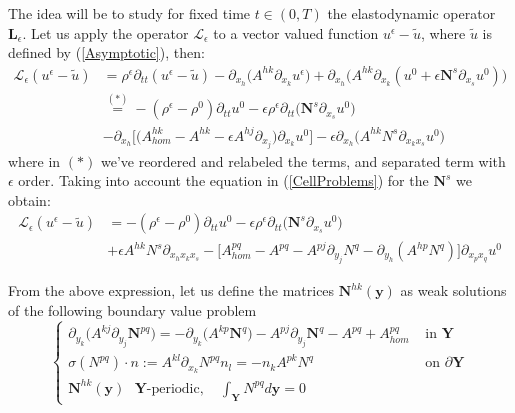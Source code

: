 The idea will be to study for fixed time $t \in (0,T)$ the elastodynamic operator $\mathbf{L}_{\epsilon}$.
Let us apply the operator $\mathcal{L}_{\epsilon}$ to a vector valued function $u^{\epsilon}-\tilde{u}$, where $\tilde{u}$ is defined by (\ref{Asymptotic}), then:
\begin{align*}
    \mathcal{L}_{\epsilon} (u^{\epsilon}-\tilde{u}) &= \rho^{\epsilon} \partial_{tt} (u^{\epsilon}-\tilde{u}) - \partial_{x_h} \big( A^{hk}\partial_{x_k} u^{\epsilon} \big) + \partial_{x_h} \big( A^{hk}\partial_{x_k} (u^0 + \epsilon \mathbf{N}^s \partial_{x_s}u^0 )\big) \\
    & \overset{(*)}{=} - (\rho^{\epsilon}-\rho^0) \partial_{tt} u^0 - \epsilon \rho^{\epsilon} \partial_{tt}\big(\mathbf{N}^s \partial_{x_s}u^0 \big)  \\
    & - \partial_{x_h} \big[ \big( A_{hom}^{hk} - A^{hk} - \epsilon A^{hj}\partial_{x_j}\big) \partial_{x_k} u^0 \big] - \epsilon \partial_{x_h} \big( A^{hk} N^s \partial_{x_k x_s} u^0 \big) 
\end{align*}
where in $(*)$ we've reordered and relabeled the terms, and separated term with $\epsilon$ order.
Taking into account the equation in (\ref{CellProblems}) for the $\mathbf{N}^s$ we obtain:
\begin{align*}
    \mathcal{L}_{\epsilon} (u^{\epsilon} - \tilde{u}) & = - (\rho^{\epsilon}-\rho^0) \partial_{tt} u^0 - \epsilon \rho^{\epsilon} \partial_{tt}\big(\mathbf{N}^s \partial_{x_s}u^0 \big)  \\
    & + \epsilon A^{hk}N^s \partial_{x_h x_k x_s} - \big[ A^{pq}_{hom} - A^{pq} - A^{pj} \partial_{y_j} N^q - \partial_{y_h}(A^{hp} N^q) \big] \partial_{x_p x_q} u^0 
\end{align*}


From the above expression, let us define the matrices $\mathbf{N}^{hk}(\mathbf{y})$ as weak solutions of the following boundary value problem
\begin{equation}
    \label{SecondCellProblem}
    \left \{
    \begin{array}{cc}
        \partial_{y_k} \big( A^{kj}\partial_{y_j} \mathbf{N}^{pq}\big) = -\partial_{y_k} \big( A^{kp} \mathbf{N}^q\big) - A^{pj}\partial_{y_j} \mathbf{N}^q - A^{pq} + A^{pq}_{hom} & \text{ in } \mathbf{Y}\\
        \sigma(N^{pq})\cdot n := A^{kl}\partial_{x_k}N^{pq}n_l = - n_k A^{pk}N^q & \text{ on } \partial \mathbf{Y} \\
        \mathbf{N}^{hk}(\mathbf{y}) \text{ $\mathbf{Y}$-periodic}, \quad  \int_{\mathbf{Y}} N^{pq} d \mathbf{y} = 0 &
    \end{array}
    \right .
\end{equation}


